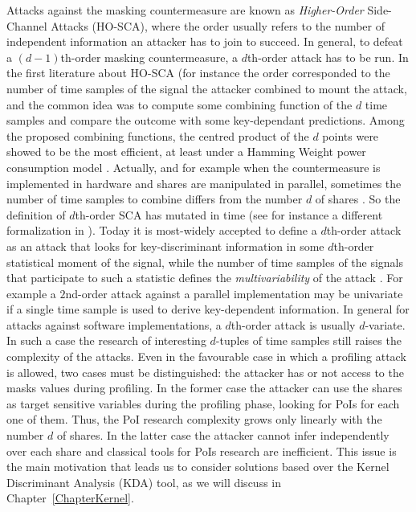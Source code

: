 Attacks against the masking countermeasure are known as \emph{Higher-Order} Side-Channel Attacks (HO-SCA), where the order usually refers to the number of independent information an attacker has to join to succeed. In general, to defeat a $(d-1)$th-order masking countermeasure, a $d$th-order attack has to be run. In the first literature about HO-SCA (for instance \cite{messerges2000using,Waddle2004,joye2005second,oswald2006practical} the order corresponded to the number of time samples of the signal the attacker combined to mount the attack, and the common idea was to compute some combining function of the $d$ time samples and compare the outcome with some key-dependant predictions. Among the proposed combining functions, the centred product of the $d$ points were showed to be the most efficient, at least under a Hamming Weight power consumption model \cite{DBLP:journals/tc/ProuffRB09}. Actually, and for example when the countermeasure is implemented in hardware and shares are manipulated in parallel, sometimes the number of time samples to combine differs from the number $d$ of shares \cite{peeters2005improved,standaert2005masking}. So the definition of $d$th-order SCA has mutated in time (see for instance a different formalization in \cite{piret2008security}). Today it is most-widely accepted to define a $d$th-order attack as an attack that looks for key-discriminant information in some $d$th-order statistical moment of the signal, while the number of time samples of the signals that participate to such a statistic defines the \emph{multivariability} of the attack \cite{gierlichs2010revisiting,batina2011mutual,carlet2014achieving}. For example a $2$nd-order attack against a parallel implementation may be univariate if a single time sample is used to derive key-dependent information. In general for attacks against software implementations, a $d$th-order attack is usually $d$-variate. In such a case the research of interesting $d$-tuples of time samples still raises the complexity of the attacks. Even in the favourable case in which a profiling attack is allowed, two cases must be distinguished: the attacker has or not access to the masks values during profiling. In the former case the attacker can use the shares as target sensitive variables during the profiling phase, looking for PoIs for each one of them. Thus, the PoI research complexity grows only linearly with the number $d$ of shares. In the latter case the attacker cannot infer independently over each share and classical tools for PoIs research are inefficient. This issue is the main motivation that leads us to consider solutions based over the Kernel Discriminant Analysis (KDA) tool, as we will discuss in Chapter~\ref{ChapterKernel}.

